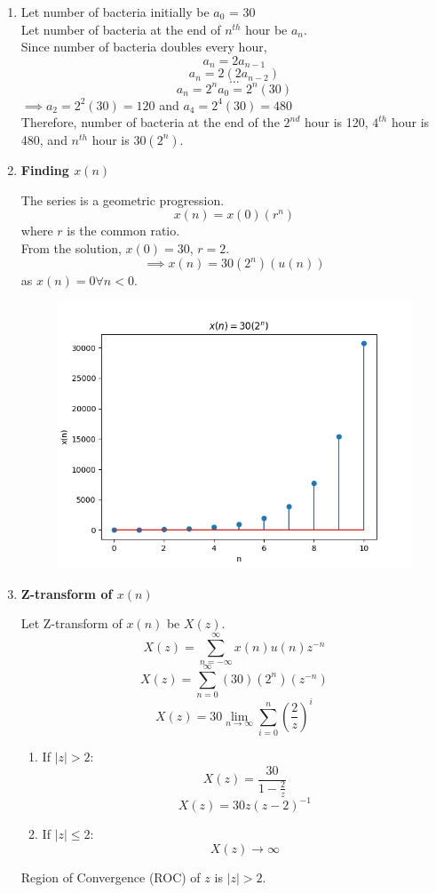 \documentclass[journal,12pt,twocolumn]{IEEEtran}
\theoremstyle{remark}
\begin{document}
\begin{enumerate}
\item
Let number of bacteria initially be $a_0$ = 30
\\
Let number of bacteria at the end of $n^{th}$ hour be $a_n$.
\\
Since number of bacteria doubles every hour, \[a_n = 2a_{n - 1}\]
\[a_n = 2(2a_{n - 2})\]
\[\dots\]
\[a_n = 2^na_0 = 2^n(30)\]
$\implies a_2 = 2^2(30) = 120$ and $a_4 = 2^4(30) = 480$
\\

Therefore, number of bacteria at the end of the $2^{nd}$ hour is 120, $4^{th}$ hour is 480, and $n^{th}$ hour is $30(2^n)$.

\item \textbf{Finding $x(n)$}

The series is a geometric progression.
\[x(n) = x(0) (r^{n})\]
where $r$ is the common ratio.\\
From the solution, $x(0) = 30$, $r = 2$.
\[\implies x(n) = 30(2^n)(u(n))\]
as $x(n) = 0 \forall n < 0$.

\begin{figure}[h!]
    \centering
    \includegraphics[width=\columnwidth]{figs/11_9_3_30.png}
\end{figure}


\item \textbf{Z-transform of $x(n)$}

Let Z-transform of $x(n)$ be $X(z)$.
\[X(z) = \sum_{n = -\infty}^{\infty} x(n)u(n)z^{-n}\]
\[X(z) = \sum_{n = 0}^{\infty} (30)(2^n)(z^{-n})\]
\[X(z) = 30\lim_{n\to\infty}\sum_{i = 0}^{n}(\frac{2}{z})^i\]

\begin{enumerate}
\item If $|z| > 2$:
\[X(z) = \frac{30}{1 - \frac{2}{z}}\]
\[X(z) = 30z(z - 2)^{-1}\]

\item If $|z| \le 2$:
\[X(z) \to \infty\]

\end{enumerate}

Region of Convergence (ROC) of $z$ is $|z| > 2$.

\end{enumerate}
\end{document}
